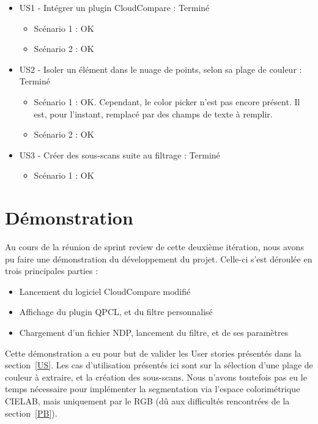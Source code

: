 \documentclass[12pt,titlepage,french]{article}
\begin{document}
\begin{itemize}
  \item US1 - Intégrer un plugin CloudCompare : Terminé
  \begin{itemize}
    \item Scénario 1 : OK
    \item Scénario 2 : OK
  \end{itemize}
  \item US2 - Isoler un élément dans le nuage de points, selon sa plage de couleur : Terminé
  \begin{itemize}
    \item Scénario 1 : OK. Cependant, le color picker n'est pas encore présent. Il est, pour l'instant, remplacé par des champs de texte à remplir.
    \item Scénario 2 : OK
  \end{itemize}
  \item US3 - Créer des sous-scans suite au filtrage : Terminé
  \begin{itemize}
    \item Scénario 1 : OK
  \end{itemize}
\end{itemize}

\section{Démonstration}

Au cours de la réunion de sprint review de cette deuxième itération, nous avons pu faire une démonstration du développement du projet. Celle-ci s'est déroulée en trois principales parties :

\begin{itemize}
  \item Lancement du logiciel CloudCompare modifié
  \item Affichage du plugin QPCL, et du filtre personnalisé
  \item Chargement d'un fichier NDP, lancement du filtre, et de ses paramètres
\end{itemize}

Cette démonstration a eu pour but de valider les User stories présentés dans la section~\ref{US}. Les cas d'utilisation présentés ici sont sur la sélection d'une plage de couleur à extraire, et la création des sous-scans. Nous n'avons toutefois pas eu le temps nécessaire pour implémenter la segmentation via l'espace colorimétrique CIELAB, mais uniquement par le RGB (dû aux difficultés rencontrées de la section~\ref{PB}).
\end{document}
